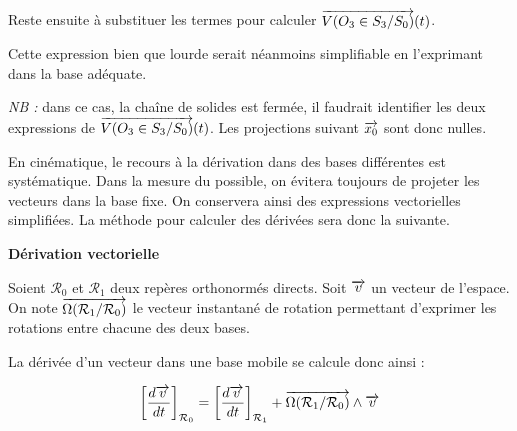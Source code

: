 \documentclass[11pt,oneside]{article}
\begin{document}
\begin{exemple}
Reste ensuite à substituer les termes pour calculer $\overrightarrow{V(O_3\in S_3/S_0)}(t)$.

Cette expression bien que lourde serait néanmoins simplifiable en l'exprimant dans la base adéquate.

\textit{NB :} dans ce cas, la chaîne de solides est fermée, il faudrait identifier les deux expressions de $\overrightarrow{V(O_3\in S_3/S_0)}(t)$. Les projections suivant $\overrightarrow{x_0}$ sont donc nulles.
\end{exemple}

En cinématique, le recours à la dérivation dans des bases différentes est systématique.
Dans la mesure du possible, on évitera toujours de projeter les vecteurs dans la base fixe. On conservera ainsi des expressions vectorielles simplifiées.
La méthode pour calculer des dérivées sera donc la suivante.

\begin{resultat}
\textbf{Dérivation vectorielle}

Soient $\mathcal{R}_0$ et $\mathcal{R}_1$ deux repères orthonormés directs. Soit $\overrightarrow{v}$ un vecteur de l'espace. On note $\overrightarrow{\Omega(\mathcal{R}_1/\mathcal{R}_0)}$ le vecteur instantané de rotation permettant d'exprimer les rotations entre chacune des deux bases. 

La dérivée d'un vecteur dans une base mobile se calcule donc ainsi :

$$
\left[\dfrac{d\overrightarrow{v}}{dt}\right]_{\mathcal{R}_0} =
\left[\dfrac{d\overrightarrow{v}}{dt}\right]_{\mathcal{R}_1} 
+ \overrightarrow{\Omega(\mathcal{R}_1/\mathcal{R}_0)}\wedge \overrightarrow{v}
$$
\end{resultat}
\end{document}
